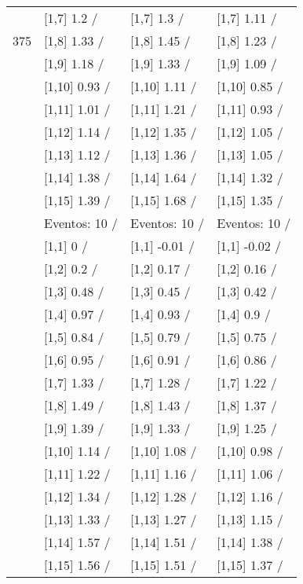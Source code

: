 \begin{table}
\begin{tabular}[t]{llll}
 & {}[1,7] 1.2  / & {}[1,7] 1.3  / & {}[1,7] 1.11  /\\
375 & {}[1,8] 1.33  / & {}[1,8] 1.45  / & {}[1,8] 1.23  /\\
\addlinespace
 & {}[1,9] 1.18  / & {}[1,9] 1.33  / & {}[1,9] 1.09  /\\
 & {}[1,10] 0.93  / & {}[1,10] 1.11  / & {}[1,10] 0.85  /\\
 & {}[1,11] 1.01  / & {}[1,11] 1.21  / & {}[1,11] 0.93  /\\
 & {}[1,12] 1.14  / & {}[1,12] 1.35  / & {}[1,12] 1.05  /\\
 & {}[1,13] 1.12  / & {}[1,13] 1.36  / & {}[1,13] 1.05  /\\
\addlinespace
 & {}[1,14] 1.38  / & {}[1,14] 1.64  / & {}[1,14] 1.32  /\\
 & {}[1,15] 1.39  / & {}[1,15] 1.68  / & {}[1,15] 1.35  /\\
 & Eventos:  10 / & Eventos:  10 / & Eventos:  10 /\\
 & {}[1,1] 0  / & {}[1,1] -0.01  / & {}[1,1] -0.02  /\\
 & {}[1,2] 0.2  / & {}[1,2] 0.17  / & {}[1,2] 0.16  /\\
\addlinespace
 & {}[1,3] 0.48  / & {}[1,3] 0.45  / & {}[1,3] 0.42  /\\
 & {}[1,4] 0.97  / & {}[1,4] 0.93  / & {}[1,4] 0.9  /\\
 & {}[1,5] 0.84  / & {}[1,5] 0.79  / & {}[1,5] 0.75  /\\
 & {}[1,6] 0.95  / & {}[1,6] 0.91  / & {}[1,6] 0.86  /\\
 & {}[1,7] 1.33  / & {}[1,7] 1.28  / & {}[1,7] 1.22  /\\
\addlinespace
500 & {}[1,8] 1.49  / & {}[1,8] 1.43  / & {}[1,8] 1.37  /\\
 & {}[1,9] 1.39  / & {}[1,9] 1.33  / & {}[1,9] 1.25  /\\
 & {}[1,10] 1.14  / & {}[1,10] 1.08  / & {}[1,10] 0.98  /\\
 & {}[1,11] 1.22  / & {}[1,11] 1.16  / & {}[1,11] 1.06  /\\
 & {}[1,12] 1.34  / & {}[1,12] 1.28  / & {}[1,12] 1.16  /\\
\addlinespace
 & {}[1,13] 1.33  / & {}[1,13] 1.27  / & {}[1,13] 1.15  /\\
 & {}[1,14] 1.57  / & {}[1,14] 1.51  / & {}[1,14] 1.38  /\\
 & {}[1,15] 1.56  / & {}[1,15] 1.51  / & {}[1,15] 1.37  /\\
\bottomrule
\end{tabular}
\end{table}
